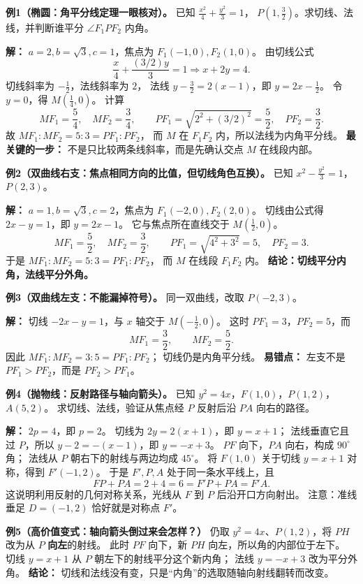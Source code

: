 \begin{examplebox}
\textbf{例1（椭圆：角平分线定理一眼核对）。}
已知 $\tfrac{x^2}{4}+\tfrac{y^2}{3}=1$，
$P(1,\tfrac32)$。求切线、法线，并判断谁平分 $\angle F_1PF_2$ 内角。

\textbf{解：} $a=2,b=\sqrt3,c=1$，焦点为 $F_1(-1,0),F_2(1,0)$。
由切线公式
\[
\frac{x}{4}+\frac{(3/2)y}{3}=1
\Longrightarrow x+2y=4.
\]
切线斜率为 $-\tfrac12$，法线斜率为 $2$，
法线 $y-\tfrac32=2(x-1)$，即 $y=2x-\tfrac12$。
令 $y=0$，得 $M(\tfrac14,0)$。
计算
\[
MF_1=\frac54,\quad MF_2=\frac34,\qquad
PF_1=\sqrt{2^2+(3/2)^2}=\frac52,\quad
PF_2=\frac32.
\]
故 $MF_1:MF_2=5:3=PF_1:PF_2$，
而 $M$ 在 $F_1F_2$ 内，所以法线为内角平分线。
\textbf{最关键的一步：} 不是只比较两条线斜率，而是先确认交点 $M$ 在线段内部。

\medskip\noindent
\textbf{例2（双曲线右支：焦点相同方向的比值，但切线角色互换）。}
已知 $x^2-\tfrac{y^2}{3}=1$，$P(2,3)$。

\textbf{解：} $a=1,b=\sqrt3,c=2$，焦点为 $F_1(-2,0),F_2(2,0)$。
切线由公式得 $2x-y=1$，即 $y=2x-1$。
它与焦点所在直线交于 $M(\tfrac12,0)$。
\[
MF_1=\frac52,\quad MF_2=\frac32,\qquad
PF_1=\sqrt{4^2+3^2}=5,\quad PF_2=3.
\]
于是 $MF_1:MF_2=5:3=PF_1:PF_2$，
而 $M$ 在线段 $F_1F_2$ 内。
\textbf{结论：切线平分内角，法线平分外角。}

\medskip\noindent
\par\medskip\begin{minipage}{\linewidth}

\textbf{例3（双曲线左支：不能漏掉符号）。}
同一双曲线，改取 $P(-2,3)$。

\textbf{解：} 切线 $-2x-y=1$，与 $x$ 轴交于 $M(-\tfrac12,0)$。
这时 $PF_1=3$，$PF_2=5$，而
\[
MF_1=\frac32,\qquad MF_2=\frac52.
\]
因此 $MF_1:MF_2=3:5=PF_1:PF_2$；
切线仍是内角平分线。
\textbf{易错点：} 左支不是 $PF_1>PF_2$，而是 $PF_2>PF_1$。

\end{minipage}\par
\medskip\noindent
\textbf{例4（抛物线：反射路径与轴向箭头）。}
已知 $y^2=4x$，$F(1,0)$，$P(1,2)$，$A(5,2)$。
求切线、法线，验证从焦点经 $P$ 反射后沿 $PA$ 向右的路径。

\begin{center}\end{center}
\textbf{解：} $2p=4$，即 $p=2$。
切线为 $2y=2(x+1)$，即 $y=x+1$；
法线垂直它且过 $P$，所以 $y-2=-(x-1)$，即 $y=-x+3$。
$PF$ 向下，$PA$ 向右，构成 $90^\circ$ 角；
法线从 $P$ 朝右下的射线与两边均成 $45^\circ$。
将 $F(1,0)$ 关于切线 $y=x+1$ 对称，得到 $F'(-1,2)$。
于是 $F',P,A$ 处于同一条水平线上，且
\[
FP+PA=2+4=6=F'P+PA=F'A.
\]
这说明利用反射的几何对称关系，光线从 $F$ 到 $P$ 后沿开口方向射出。
注意：准线垂足 $D=(-1,2)$ 恰好就是对称点 $F'$。

\medskip\noindent
\textbf{例5（高价值变式：轴向箭头倒过来会怎样？）}
仍取 $y^2=4x$、$P(1,2)$，将 $PH$ 改为从 $P$ \textbf{向左}的射线。
此时 $PF$ 向下，新 $PH$ 向左，所以角的内部位于左下。
切线 $y=x+1$ 从 $P$ 朝左下的射线平分这个新内角；
法线 $y=-x+3$ 改为平分外角。
\textbf{结论：} 切线和法线没有变，只是“内角”的选取随轴向射线翻转而改变。
\end{examplebox}

